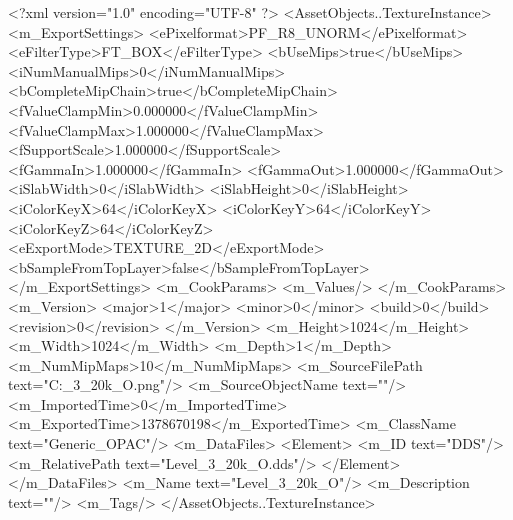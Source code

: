 <?xml version="1.0" encoding="UTF-8" ?>
<AssetObjects..TextureInstance>
	<m_ExportSettings>
		<ePixelformat>PF_R8_UNORM</ePixelformat>
		<eFilterType>FT_BOX</eFilterType>
		<bUseMips>true</bUseMips>
		<iNumManualMips>0</iNumManualMips>
		<bCompleteMipChain>true</bCompleteMipChain>
		<fValueClampMin>0.000000</fValueClampMin>
		<fValueClampMax>1.000000</fValueClampMax>
		<fSupportScale>1.000000</fSupportScale>
		<fGammaIn>1.000000</fGammaIn>
		<fGammaOut>1.000000</fGammaOut>
		<iSlabWidth>0</iSlabWidth>
		<iSlabHeight>0</iSlabHeight>
		<iColorKeyX>64</iColorKeyX>
		<iColorKeyY>64</iColorKeyY>
		<iColorKeyZ>64</iColorKeyZ>
		<eExportMode>TEXTURE_2D</eExportMode>
		<bSampleFromTopLayer>false</bSampleFromTopLayer>
	</m_ExportSettings>
	<m_CookParams>
		<m_Values/>
	</m_CookParams>
	<m_Version>
		<major>1</major>
		<minor>0</minor>
		<build>0</build>
		<revision>0</revision>
	</m_Version>
	<m_Height>1024</m_Height>
	<m_Width>1024</m_Width>
	<m_Depth>1</m_Depth>
	<m_NumMipMaps>10</m_NumMipMaps>
	<m_SourceFilePath text="C:\Users\Shadow\Desktop\Prototypes\Level_3_20k_O.png"/>
	<m_SourceObjectName text=""/>
	<m_ImportedTime>0</m_ImportedTime>
	<m_ExportedTime>1378670198</m_ExportedTime>
	<m_ClassName text="Generic_OPAC"/>
	<m_DataFiles>
		<Element>
			<m_ID text="DDS"/>
			<m_RelativePath text="Level_3_20k_O.dds"/>
		</Element>
	</m_DataFiles>
	<m_Name text="Level_3_20k_O"/>
	<m_Description text=""/>
	<m_Tags/>
</AssetObjects..TextureInstance>

